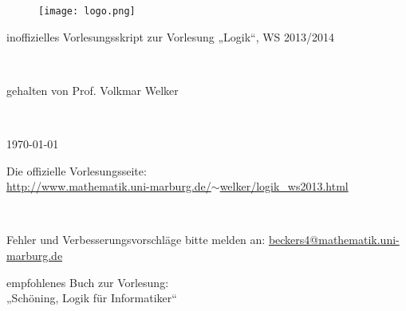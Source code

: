 \documentclass[a4paper, titlepage]{scrartcl}
\begin{document}


\begin{figure}[h]
\centering
\texttt{[image: logo.png]}
\end{figure}

\begin{center}
\begin{huge}inoffizielles Vorlesungsskript zur Vorlesung „Logik“, WS 2013/2014\end{huge}\\
\vspace{1cm}
\begin{large}gehalten von Prof. Volkmar Welker\end{large}\\
\vspace{1cm}
\begin{Large}\today \end{Large}
\end{center}

\noindent
\begin{center}
Die offizielle Vorlesungsseite:\\
\href{http://www.mathematik.uni-marburg.de/~welker/logik\_ws2013.html}{http://www.mathematik.uni-marburg.de/$\sim$welker/logik\_ws2013.html}
\end{center}

\noindent\\
\begin{center}\begin{Large}Fehler und Verbesserungsvorschläge bitte melden an: \href{mailto:beckers4@mathematik.uni-marburg.de}{beckers4@mathematik.uni-marburg.de}\end{Large}\end{center}
\vspace{1cm}
\begin{center}
empfohlenes Buch zur Vorlesung:\\
„Schöning, Logik für Informatiker“
\end{center}

\newpage

\tableofcontents

\newpage





\newpage

\end{document}
